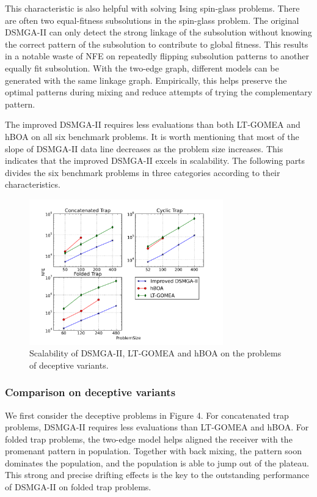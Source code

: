 \documentclass{sig-alternate-05-2015}
\begin{document}
This characteristic is also helpful with solving Ising spin-glass problems. 
There are often two equal-fitness subsolutions in the spin-glass problem.
The original DSMGA-II can only detect the strong linkage of the subsolution without knowing the correct pattern of the subsolution to contribute to global fitness.
This results in a notable waste of NFE on repeatedly flipping subsolution patterns to another equally fit subsolution.
With the two-edge graph, different models can be generated with the same linkage graph. 
Empirically, this helps preserve the optimal patterns during mixing and reduce attempts of trying the complementary pattern.


The improved DSMGA-II requires less evaluations than both LT-GOMEA and hBOA on all six benchmark problems.
It is worth mentioning that most of the slope of DSMGA-II data line decreases as the problem size increases.
This indicates that the improved DSMGA-II excels in scalability.
The following parts divides the six benchmark problems in three categories according to their characteristics. 


\begin{figure}
\centering
\includegraphics[width=3.3in]{trapResults}
\caption{Scalability of DSMGA-II, LT-GOMEA and hBOA on the problems of deceptive variants.}
\end{figure}

\subsubsection{ Comparison on deceptive variants }


We first consider the deceptive problems in Figure 4.
For concatenated trap problems, DSMGA-II requires less evaluations than LT-GOMEA and hBOA.
For folded trap problems, the two-edge model helps aligned the receiver with the promenant pattern in population.
Together with back mixing, the pattern soon dominates the population, and the population is able to jump out of the plateau. 
This strong and precise drifting effects is the key to the outstanding performance of DSMGA-II on folded trap problems.
\end{document}
